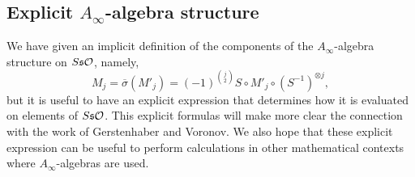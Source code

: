 \documentclass[join.tex]{subfiles}
\begin{document}
 \subsection{Explicit $A_\infty$-algebra structure}\label{sect4}

We have given an implicit definition of the components of the $A_\infty$-algebra structure on $S\mathfrak{s}{\mathcal O}$, namely, \[M_j=\overline{\sigma}(M'_j)=(-1)^{\binom{j}{2}}S\circ M'_j\circ(S^{-1})^{\otimes j},\]
but it is useful to have an explicit expression that determines how it is evaluated on elements of $S\mathfrak{s}{\mathcal O}$.  This explicit formulas will make more clear the connection with the work of Gerstenhaber and Voronov.  We also hope that these explicit expression can be useful to perform calculations in other mathematical contexts where $A_\infty$-algebras are used.
\end{document}
